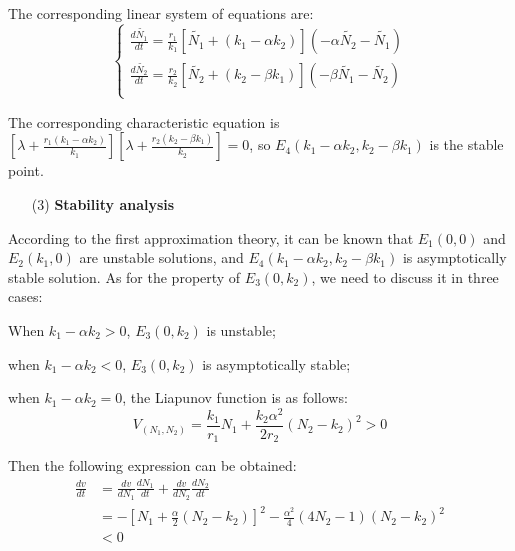 \begin{itemize}
    The corresponding linear system of equations are:
    \begin{equation}\label{}
        \left\{
        \begin{array}{l}
            \frac{d\widetilde{N_{1}}}{dt}=\frac{r_{1}}{k_{1}}[\widetilde{N_{1}}+(k_{1}-\alpha k_{2})](-\alpha\widetilde{N_{2}}-\widetilde{N_{1}}) \\
            \frac{d\widetilde{N_{2}}}{dt}=\frac{r_{2}}{k_{2}}[\widetilde{N_{2}}+(k_{2}-\beta k_{1})](-\beta\widetilde{N_{1}}-\widetilde{N_{2}}) \\
        \end{array}
        \right.
        \end{equation}
    
    The corresponding characteristic equation is $[\lambda+\frac{r_{1}(k_{1}-\alpha k_{2})}{k_{1}}][\lambda+\frac{r_{2}(k_{2}-\beta k_{1})}{k_{2}}]=0$, so $E_{4}(k_{1}-\alpha k_{2},k_{2}-\beta k_{1})$ is the stable point.

\end{itemize}

\begin{itemize}
    \item [(3)] 
    \textbf{Stability analysis}
\end{itemize}

According to the first approximation theory, it can be known that $E_{1}(0,0)$ and $E_{2}(k_{1},0)$ are unstable solutions, and $E_{4}(k_{1}-\alpha k_{2},k_{2}-\beta k_{1})$ is asymptotically stable solution. As for the property of $E_{3}(0,k_{2})$, we need to discuss it in three cases:

When $k_{1}-\alpha k_{2}>0$, $E_{3}(0,k_{2})$ is unstable;

when $k_{1}-\alpha k_{2}<0$, $E_{3}(0,k_{2})$ is asymptotically stable;

when $k_{1}-\alpha k_{2}=0$, the Liapunov function is as follows:
    $$V_{(N_{1},N_{2})}=\frac{k_{1}}{r_{1}}N_{1}+\frac{k_{2}\alpha^2}{2r_{2}}(N_{2}-k_{2})^2>0 $$

Then the following expression can be obtained:
    \begin{equation}\label{}
    \begin{split}
    \frac{dv}{dt}&=\frac{dv}{dN_{1}}\frac{dN_{1}}{dt}+\frac{dv}{dN_{2}}\frac{dN_{2}}{dt} \\
    &=-[N_{1}+\frac{\alpha}{2}(N_{2}-k_{2})]^2-\frac{\alpha^2}{4}(4N_{2}-1)(N_{2}-k_{2})^2\\
    &<0 \\
    \end{split}
    \end{equation}


